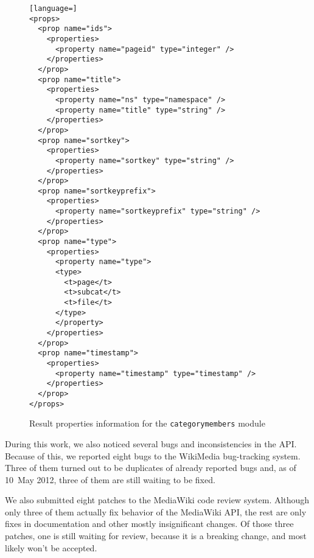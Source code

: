 \begin{figure}[htbp]

\begin{lstlisting}[language=]
<props>
  <prop name="ids">
    <properties>
      <property name="pageid" type="integer" />
    </properties>
  </prop>
  <prop name="title">
    <properties>
      <property name="ns" type="namespace" />
      <property name="title" type="string" />
    </properties>
  </prop>
  <prop name="sortkey">
    <properties>
      <property name="sortkey" type="string" />
    </properties>
  </prop>
  <prop name="sortkeyprefix">
    <properties>
      <property name="sortkeyprefix" type="string" />
    </properties>
  </prop>
  <prop name="type">
    <properties>
      <property name="type">
      <type>
        <t>page</t>
        <t>subcat</t>
        <t>file</t>
      </type>
      </property>
    </properties>
  </prop>
  <prop name="timestamp">
    <properties>
      <property name="timestamp" type="timestamp" />
    </properties>
  </prop>
</props>
\end{lstlisting}

\caption{Result properties information for the \texttt{categorymembers} module}
\label{paraminfo props}
\end{figure}

During this work, we also noticed several bugs and inconsistencies in the API.
Because of this, we reported eight bugs to the WikiMedia bug-tracking system.
Three of them turned out to be duplicates of already reported bugs and,
as of 10~May 2012, three of them are still waiting to be fixed.

We also submitted eight patches to the MediaWiki code review system.
Although only three of them actually fix behavior of the MediaWiki API,
the rest are only fixes in documentation and other mostly insignificant changes.
Of those three patches, one is still waiting for review, because it is a breaking change,
and most likely won't be accepted.